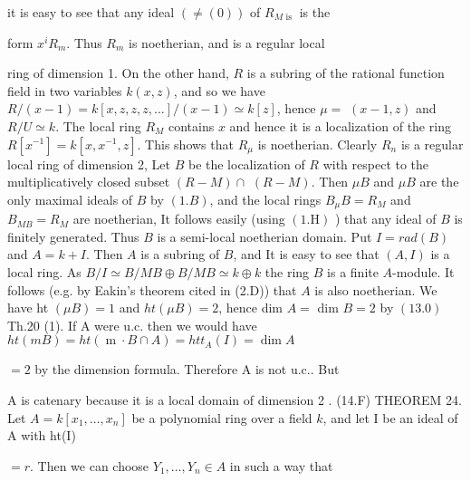 it is easy to see that any ideal $(\neq(0))$ of $R_{M \text { is }}$ is the

form $x^{i} R_{m}$. Thus $R_{m}$ is noetherian, and is a regular local

ring of dimension 1. On the other hand, $R$ is a subring of the rational function field in two variables $k(x, z)$, and so we have $R /(x-1)=k[x, z, z, z, \ldots] /(x-1) \simeq k[z]$, hence $\mu=$ $(x-1, z)$ and $R / U \simeq k$. The local ring $R_{M}$ contains $x$ and hence it is a localization of the ring $R\left[x^{-1}\right]=k\left[x, x^{-1}, z\right]$. This shows that $R_{\mu}$ is noetherian. Clearly $R_{n}$ is a regular local ring of dimension 2, Let $B$ be the localization of $R$ with respect to the multiplicatively closed subset $(R-M) \cap$ $(R-M) .$ Then $\mu B$ and $\mu B$ are the only maximal ideals of $B$ by $(1 . B)$, and the local rings $B_{\mu} B=R_{M}$ and $B_{M B}=R_{M}$ are noetherian, It follows easily (using $(1 . \mathrm{H})$ ) that any ideal of $B$ is finitely generated. Thus $B$ is a semi-local noetherian domain. Put $I=r a d(B)$ and $A=k+I$. Then $A$ is a subring of $B$, and It is easy to see that $(A, I)$ is a local ring. As $B / I \simeq B / M B \oplus B / M B \simeq k \oplus k$ the ring $B$ is a finite $A$-module. It follows (e.g. by Eakin's theorem cited in (2.D)) that $A$ is also noetherian. We have ht $(\mu B)=1$ and $h t(\mu B)=2$, hence dim $A=$ dim $B=2$ by $(13.0)$ Th.20 (1). If A were u.c. then we would have $h t(m B)=h t(\operatorname{m} \cdot B \cap A)=h t t_{A}(I)=\operatorname{dim} A$

$=2$ by the dimension formula. Therefore A is not u.c.. But

A is catenary because it is a local domain of dimension 2 . (14.F) THEOREM 24. Let $A=k\left[x_{1}, \ldots, x_{n}\right]$ be a polynomial ring over a field $k$, and let I be an ideal of A with ht(I)

$=r$. Then we can choose $Y_{1}, \ldots, Y_{n} \in A$ in such a way that

